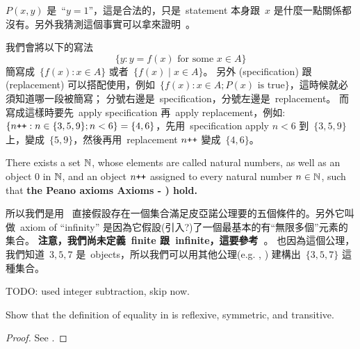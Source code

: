 \begin{note}
\(P(x, y)\) 是\ ``\(y = 1\)''，這是合法的，只是\ statement 本身跟\ \(x\) 是什麼一點關係都沒有。另外我猜測這個事實可以拿來證明\ 。
\end{note}

\begin{note}
我們會將以下的寫法
\[
    \{y : y = f(x) \text{\ for some \(x \in A\)}\}
\]
簡寫成\ \( \{f(x): x \in A \} \) 或者\ \( \{f(x) \mid x \in A \} \)。
另外  (specification) 跟\  (replacement) 可以搭配使用，例如\ \(\{f(x) : x \in A; P(x) \text{\ is true}\} \)，這時候就必須知道哪一段被簡寫；
分號右邊是\ specification，分號左邊是\ replacement。
而寫成這樣時要先\ apply specification 再\ apply replacement，例如: \( \{n\texttt{++} : n \in \{3, 5, 9\}; n < 6 \} = \{4, 6\} \)，先用\ specification apply \(n < 6\) 到\ \(\{3, 5, 9\}\) 上，變成\  \(\{5, 9\}\)，然後再用\ replacement \(n\texttt{++}\) 變成\ \(\{4, 6\}\)。
\end{note}

\begin{axiom} [Infinity] \label{axm 3.7}
There exists a set \(\mathbb{N}\), whose elements are called natural numbers, as well as an object \(0\) in \(\mathbb{N}\), and an object \(n\texttt{++}\) assigned to every natural number \(n \in \mathbb{N}\), such that \textbf{the Peano axioms Axioms  - ) hold.}
\end{axiom}

\begin{note}
所以我們是用\  直接假設存在一個集合滿足皮亞諾公理要的五個條件的。另外它叫做\ axiom of ``infinity'' 是因為它假設(引入?)了一個最基本的有``無限多個''元素的集合。
\textbf{注意，我們尚未定義\ finite 跟\ infinite，這要參考\  }。
也因為這個公理，我們知道\ \(3, 5, 7\) 是\ objects，所以我們可以用其他公理(e.g. , ) 建構出\ \( \{ 3, 5, 7 \}\) 這種集合。
\end{note}

\begin{example} \label{example 3.1.33}
TODO: used integer subtraction, skip now.
\end{example}

\exercisesection

\begin{exercise}\label{exercise 3.1.1}
Show that the definition of equality in  is reflexive, symmetric, and transitive.
\end{exercise}

\begin{proof}
See .
\end{proof}

